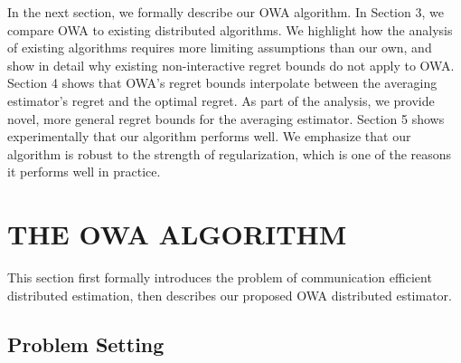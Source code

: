 \documentclass[twoside]{article}
\DeclareMathOperator*{\argmax}{arg\,max}
\newcommand{\Y}{\mathcal{Y}}
\newcommand{\X}{\mathcal{X}}
\newcommand{\x}{\mathbf{x}}
\newcommand{\w}{\theta}
\newcommand{\wmle}{\hat\w^{mle}}
\newcommand{\trans}[1]{\ensuremath{{#1}^{\mathsf{T}}}}
\begin{document}

In the next section, we formally describe our OWA algorithm.
In Section 3, we compare OWA to existing distributed algorithms.
We highlight how the analysis of existing algorithms requires more limiting assumptions than our own,
and show in detail why existing non-interactive regret bounds do not apply to OWA.
Section 4 shows that OWA's regret bounds interpolate between the averaging estimator's regret and the optimal regret.
As part of the analysis, we provide novel, more general regret bounds for the averaging estimator.
Section 5 shows experimentally that our algorithm performs well.
We emphasize that our algorithm is robust to the strength of regularization,
which is one of the reasons it performs well in practice.

\section{THE OWA ALGORITHM}


This section first formally introduces the problem of communication efficient distributed estimation,
then describes our proposed OWA distributed estimator.

\subsection{Problem Setting}
\end{document}
